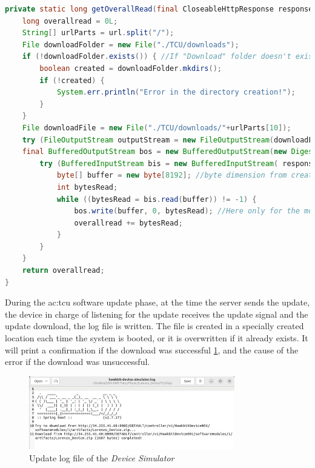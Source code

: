 \begin{lstlisting}[language=Java, caption={Downloading files from the \textit{OTA} server to the specific device simulator folder}, label=lst:OverallReadHDS]
private static long getOverallRead(final CloseableHttpResponse response, final MessageDigest md, final String url) throws IOException {
    long overallread = 0L;
    String[] urlParts = url.split("/");
    File downloadFolder = new File("./TCU/downloads");
    if (!downloadFolder.exists()) { //If "Download" folder doesn't exist
        boolean created = downloadFolder.mkdirs();
        if (!created) {
            System.err.println("Error in the directory creation!");
        }
    }
    File downloadFile = new File("./TCU/downloads/"+urlParts[10]);
    try (FileOutputStream outputStream = new FileOutputStream(downloadFile);
    final BufferedOutputStream bos = new BufferedOutputStream(new DigestOutputStream(outputStream, md))) {
        try (BufferedInputStream bis = new BufferedInputStream( response.getEntity().getContent())) {
            byte[] buffer = new byte[8192]; //byte dimension from createBuffer of ByteStream.class
            int bytesRead;
            while ((bytesRead = bis.read(buffer)) != -1) {
                bos.write(buffer, 0, bytesRead); //Here only for the md hash correctness.
                overallread += bytesRead;
            }
        }
    }
    return overallread;
}
\end{lstlisting}

During the \gls{ac:tcu} software update phase, at the time the server sends the update, the device in charge of listening for the update receives the update signal and the update download, the log file is written. The file is created in a specially created location each time the system is booted, or it is overwritten if it already exists. It will print a confirmation if the download was successful \ref{fig:update_log_HDS}, and the cause of the error if the download was unsuccessful.

\begin{figure}[h]  %
    \centering
    \includegraphics[width=0.8\textwidth]{images/update_log_HDS.png}  %
    \caption{Update log file of the \textit{Device Simulator}}
    \label{fig:update_log_HDS}
\end{figure} 

